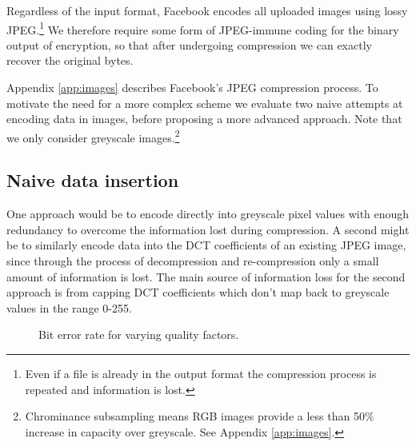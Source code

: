 
Regardless of the input format, Facebook encodes all uploaded images using lossy JPEG.\footnote{Even if a file is already in the output format the compression process is repeated and information is lost.} We therefore require some form of JPEG-immune coding for the binary output of encryption, so that after undergoing compression we can exactly recover the original bytes.

Appendix \ref{app:images} describes Facebook's JPEG compression process. To motivate the need for a more complex scheme we evaluate two naive attempts at encoding data in images, before proposing a more advanced approach. Note that we only consider greyscale images.\footnote{Chrominance subsampling means RGB images provide a less than 50\% increase in capacity over greyscale. See Appendix \ref{app:images}.}


\subsection{Naive data insertion}
\label{ssec:naive}

One approach would be to encode directly into greyscale pixel values with enough redundancy to overcome the information lost during compression. A second might be to similarly encode data into the DCT coefficients of an existing JPEG image, since through the process of decompression and re-compression only a small amount of information is lost. The main source of information loss for the second approach is from capping DCT coefficients which don't map back to greyscale values in the range 0-255.

\begin{figure}[tbph]
  \begin{center}
    \caption{Bit error rate for varying quality factors.}
    \label{graph:ber0}
  \end{center}
\end{figure}

